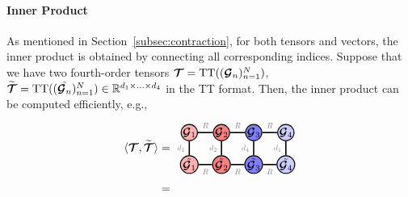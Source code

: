 \paragraph{Inner Product}
As mentioned in Section~\ref{subsec:contraction}, for both tensors and vectors, the inner product is obtained by connecting all corresponding indices. Suppose that we have two fourth-order tensors $\bm{\mathcal{T}}=\operatorname*{\operatorname{TT}}(({\bm{\mathcal{G}}_n})_{n=1}^N)$, $\widetilde{\bm{\mathcal{T}}}=\operatorname*{\operatorname{TT}}(({\Tilde{\bm{\mathcal{G}}_n}})_{n=1}^N)\in\mathbb{R}^{d_1\times...\times d_4}$ in the TT format. Then, the inner product can be computed efficiently, e.g.,
\begin{align}\label{eq:tt-inner}
\langle\Tt,\widetilde{\Tt}\rangle 
&=
    \begin{tikzpicture}[baseline=\baseline]
    \tikzset{tensor/.style = {minimum size = 0.5cm,shape = circle,thick,draw=black,inner sep = 0pt}, edge/.style   = {thick,line width=.4mm},every loop/.style={}}
    \def\y{0}
    \def\x{0}
  \node[tensor,fill=red!30!white] (G1) at (\x,\y+0.5){$\Gt_1$};
  \node[tensor,fill=red!50!white] (G2) at (\x+1,\y+0.5){$\Gt_2$};
  \node[tensor,fill=blue!50!white] (G3) at (\x+2,\y+0.5){$\Gt_3$};
   \node[tensor,fill=blue!20!white] (G4) at (\x+3,\y+0.5){$\Gt_4$};
\node[tensor,fill=red!30!white] (Gtilde1) at (\x,\y-0.5){$\Tilde{\Gt_1}$};
  \node[tensor,fill=red!50!white] (Gtilde2) at (\x+1,\y-0.5){$\Tilde{\Gt_2}$};
  \node[tensor,fill=blue!50!white] (Gtilde3) at (\x+2,\y-0.5){$\Tilde{\Gt_3}$};
   \node[tensor,fill=blue!20!white] (Gtilde4) at (\x+3,\y-0.5){$\Tilde{\Gt_4}$};
    \draw[edge](G1) -- (Gtilde1)node [midway,left] {\edgelabel{$d_1$}};
    \draw[edge](G2) -- (Gtilde2)node [midway,left] {\edgelabel{$d_2$}};
    \draw[edge](G3) -- (Gtilde3)node [midway,left] {\edgelabel{$d_4$}};
     \draw[edge](G4) -- (Gtilde4)node [midway,left] {\edgelabel{$d_1$}};
    \draw[edge](G1) -- (G2) node [midway,above] {\edgelabel{$R$}};
    \draw[edge](G2) -- (G3) node [midway,above] {\edgelabel{$R$}};
    \draw[edge](G3) -- (G4) node [midway,above] {\edgelabel{$R$}};
    \draw[edge](Gtilde1) -- (Gtilde2) node [midway,below] {\edgelabel{$R$}};
    \draw[edge](Gtilde2) -- (Gtilde3) node [midway,below] {\edgelabel{$R$}};
    \draw[edge](Gtilde3) -- (Gtilde4) node [midway,below] {\edgelabel{$R$}};
\end{tikzpicture}\nonumber\\
&=
\begin{tikzpicture}[baseline=\baseline]
    \tikzset{tensor/.style = {minimum size = 0.5cm,shape = circle,thick,draw=black,inner sep = 0pt}, edge/.style   = {thick,line width=.4mm},every loop/.style={}}

\end{tikzpicture}
\end{align}
